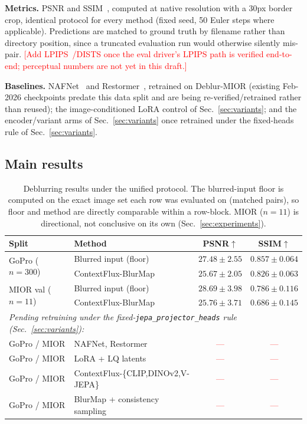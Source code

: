 \documentclass{article}
\newcommand{\tbd}{\textcolor{red}{---}}
\newcommand{\authnote}[1]{\textcolor{red}{\footnotesize [#1]}}
\begin{document}
\textbf{Metrics.} PSNR and SSIM~\cite{wang2004image}, computed at native resolution with a 30px border crop, identical protocol for every method (fixed seed, 50 Euler steps where applicable). Predictions are matched to ground truth by filename rather than directory position, since a truncated evaluation run would otherwise silently mis-pair. \authnote{Add LPIPS~\cite{zhang2018unreasonable}/DISTS once the eval driver's LPIPS path is verified end-to-end; perceptual numbers are not yet in this draft.}

\textbf{Baselines.} NAFNet~\cite{chen2022nafnet} and Restormer~\cite{zamir2022restormer}, retrained on Deblur-MIOR (existing Feb-2026 checkpoints predate this data split and are being re-verified/retrained rather than reused); the image-conditioned LoRA control of Sec.~\ref{sec:variants}; and the encoder/variant arms of Sec.~\ref{sec:variants} once retrained under the fixed-heads rule of Sec.~\ref{sec:variants}.

\subsection{Main results}
\begin{table}[t]
\centering
\caption{Deblurring results under the unified protocol. The blurred-input floor is computed on the exact image set each row was evaluated on (matched pairs), so floor and method are directly comparable within a row-block. MIOR ($n{=}11$) is directional, not conclusive on its own (Sec.~\ref{sec:experiments}).}
\label{tab:main}
\footnotesize
\setlength\tabcolsep{3pt}
\begin{tabular}{llcc}
\toprule
Split & Method & PSNR$\uparrow$ & SSIM$\uparrow$ \\
\midrule
\multirow{2}{*}{GoPro ($n{=}300$)}
 & Blurred input (floor)      & $27.48 \pm 2.55$ & $0.857 \pm 0.064$ \\
 & ContextFlux-BlurMap        & $25.67 \pm 2.05$ & $0.826 \pm 0.063$ \\
\midrule
\multirow{2}{*}{MIOR val ($n{=}11$)}
 & Blurred input (floor)      & $28.69 \pm 3.98$ & $0.786 \pm 0.116$ \\
 & ContextFlux-BlurMap        & $25.76 \pm 3.71$ & $0.686 \pm 0.145$ \\
\midrule
\multicolumn{4}{l}{\textit{Pending retraining under the fixed-\texttt{jepa\_projector\_heads} rule (Sec.~\ref{sec:variants}):}}\\
GoPro / MIOR & NAFNet, Restormer          & \tbd & \tbd \\
GoPro / MIOR & LoRA + LQ latents          & \tbd & \tbd \\
GoPro / MIOR & ContextFlux-\{CLIP,DINOv2,V-JEPA\} & \tbd & \tbd \\
GoPro / MIOR & BlurMap + consistency sampling & \tbd & \tbd \\
\bottomrule
\end{tabular}
\end{table}
\end{document}
